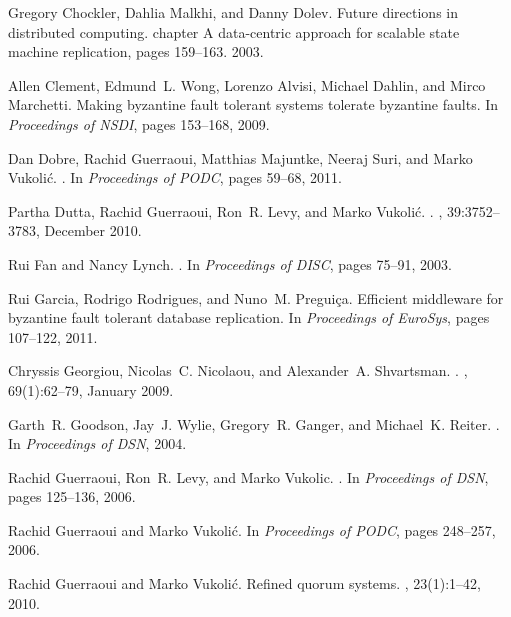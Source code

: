 \documentclass[10pt,conference,compsocconf]{IEEEtran}
\begin{document}
\begin{thebibliography}{10}
Gregory Chockler, Dahlia Malkhi, and Danny Dolev.
\newblock Future directions in distributed computing.
\newblock chapter A data-centric approach for scalable state machine
  replication, pages 159--163. 2003.

Allen Clement, Edmund~L. Wong, Lorenzo Alvisi, Michael Dahlin, and Mirco
  Marchetti.
\newblock Making byzantine fault tolerant systems tolerate byzantine faults.
\newblock In {\em Proceedings of NSDI}, pages 153--168, 2009.

Dan Dobre, Rachid Guerraoui, Matthias Majuntke, Neeraj Suri, and Marko
  Vukoli\'{c}.
.
\newblock In {\em Proceedings of PODC}, pages 59--68, 2011.

Partha Dutta, Rachid Guerraoui, Ron~R. Levy, and Marko Vukoli\'{c}.
.
, 39:3752--3783, December 2010.

Rui Fan and Nancy Lynch.
.
\newblock In {\em Proceedings of DISC}, pages 75--91, 2003.

Rui Garcia, Rodrigo Rodrigues, and Nuno~M. Pregui\c{c}a.
\newblock Efficient middleware for byzantine fault tolerant database
  replication.
\newblock In {\em Proceedings of EuroSys}, pages 107--122, 2011.

Chryssis Georgiou, Nicolas~C. Nicolaou, and Alexander~A. Shvartsman.
.
, 69(1):62--79, January 2009.

Garth~R. Goodson, Jay~J. Wylie, Gregory~R. Ganger, and Michael~K. Reiter.
.
\newblock In {\em Proceedings of DSN}, 2004.

Rachid Guerraoui, Ron~R. Levy, and Marko Vukolic.
.
\newblock In {\em Proceedings of DSN}, pages 125--136, 2006.

Rachid Guerraoui and Marko Vukoli\'{c}.
\newblock In {\em Proceedings of PODC}, pages 248--257, 2006.

Rachid Guerraoui and Marko Vukoli\'c.
\newblock Refined quorum systems.
, 23(1):1--42, 2010.


\end{thebibliography}
\end{document}
